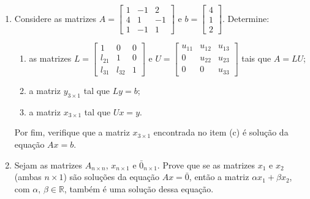 \documentclass[12pt,a4paper]{article}
\begin{document}
\begin{enumerate}
  \item Considere as matrizes 
    $A = \begin{bmatrix} 1 & -1 & 2 \\ 4 & 1 & -1 \\ 1 & -1 & 1\end{bmatrix}$ e 
    $b = \begin{bmatrix} 4 \\ 1 \\ 2\end{bmatrix}$. Determine:
    
    \begin{enumerate}
      \item as matrizes $L = \begin{bmatrix} 1 & 0 & 0 \\ l_{21} & 1 & 0 \\ l_{31} & l_{32} & 1\end{bmatrix}$ 
        e $U = \begin{bmatrix} u_{11} & u_{12} & u_{13} \\ 0 & u_{22} & u_{23} \\ 0 & 0 & u_{33}\end{bmatrix}$ 
        tais que $A = LU$;
      \item a matriz $y_{3\times 1}$ tal que $Ly = b$;
      \item a matriz $x_{3\times 1}$ tal que $Ux = y$.
    \end{enumerate}
    
    Por fim, verifique que a matriz $x_{3\times 1}$ encontrada no item (c) 
    é solução da equação $Ax = b$.

  \item Sejam as matrizes $A_{n\times n}$, $x_{n\times 1}$ e $\bar{0}_{n\times 1}$. Prove 
    que se as matrizes $x_1$ e $x_2$ (ambas $n\times 1$) são soluções da equação 
    $Ax = \bar{0}$, então a matriz $\alpha x_1 + \beta x_2$, com $\alpha,\,\beta\in\mathbb{R}$, 
    também é uma solução dessa equação.
\end{enumerate}
\end{document}
